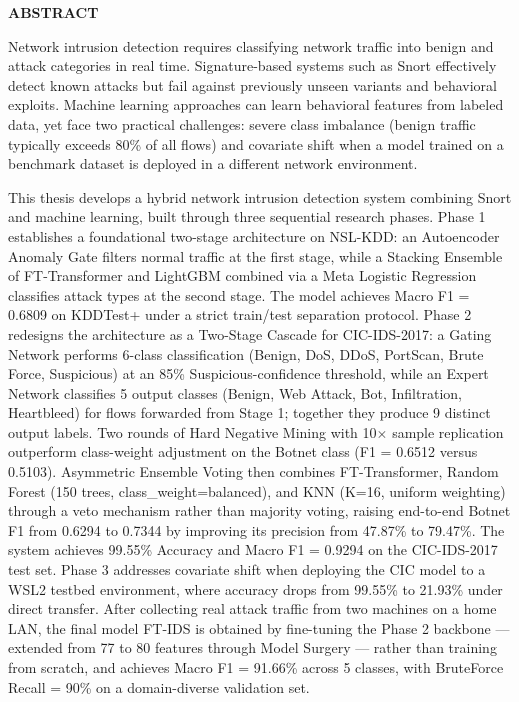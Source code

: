 \documentclass[../DoAn.tex]{subfiles}
\begin{document}
\begin{center}
    \Large{\textbf{ABSTRACT}}\\
\end{center}
\vspace{1cm}

Network intrusion detection requires classifying network traffic into benign and attack categories in real time. Signature-based systems such as Snort effectively detect known attacks but fail against previously unseen variants and behavioral exploits. Machine learning approaches can learn behavioral features from labeled data, yet face two practical challenges: severe class imbalance (benign traffic typically exceeds 80\% of all flows) and covariate shift when a model trained on a benchmark dataset is deployed in a different network environment.

This thesis develops a hybrid network intrusion detection system combining Snort and machine learning, built through three sequential research phases. Phase 1 establishes a foundational two-stage architecture on NSL-KDD: an Autoencoder Anomaly Gate filters normal traffic at the first stage, while a Stacking Ensemble of FT-Transformer and LightGBM combined via a Meta Logistic Regression classifies attack types at the second stage. The model achieves Macro F1 = 0.6809 on KDDTest+ under a strict train/test separation protocol. Phase 2 redesigns the architecture as a Two-Stage Cascade for CIC-IDS-2017: a Gating Network performs 6-class classification (Benign, DoS, DDoS, PortScan, Brute Force, Suspicious) at an 85\% Suspicious-confidence threshold, while an Expert Network classifies 5 output classes (Benign, Web Attack, Bot, Infiltration, Heartbleed) for flows forwarded from Stage 1; together they produce 9 distinct output labels. Two rounds of Hard Negative Mining with 10$\times$ sample replication outperform class-weight adjustment on the Botnet class (F1 = 0.6512 versus 0.5103). Asymmetric Ensemble Voting then combines FT-Transformer, Random Forest (150 trees, class\_weight=balanced), and KNN (K=16, uniform weighting) through a veto mechanism rather than majority voting, raising end-to-end Botnet F1 from 0.6294 to 0.7344 by improving its precision from 47.87\% to 79.47\%. The system achieves 99.55\% Accuracy and Macro F1 = 0.9294 on the CIC-IDS-2017 test set. Phase 3 addresses covariate shift when deploying the CIC model to a WSL2 testbed environment, where accuracy drops from 99.55\% to 21.93\% under direct transfer. After collecting real attack traffic from two machines on a home LAN, the final model FT-IDS is obtained by fine-tuning the Phase 2 backbone --- extended from 77 to 80 features through Model Surgery --- rather than training from scratch, and achieves Macro F1 = 91.66\% across 5 classes, with BruteForce Recall = 90\% on a domain-diverse validation set.
\end{document}
